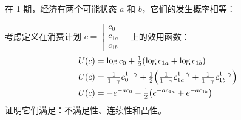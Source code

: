 \begin{problem}
 在 1 期，经济有两个可能状态 $a$ 和 $b$，它们的发生概率相等：
\begin{center}
\end{center}
考虑定义在消费计划 $c=\begin{bmatrix}c_{0} \\ c_{1a} \\ c_{1b}\end{bmatrix}$ 上的效用函数：
\[
    \begin{aligned}
        U(c) &= \log c_{0}+\tfrac12(\log c_{1a}+\log c_{1b})\\
        U(c) &= \tfrac{1}{1-\gamma}c_{0}^{1-\gamma}+\tfrac12\Bigl(\tfrac{1}{1-\gamma}c_{1a}^{1-\gamma}+\tfrac{1}{1-\gamma}c_{1b}^{1-\gamma}\Bigr)\\
        U(c) &= -e^{-ac_{0}}-\tfrac12\bigl(e^{-ac_{1a}}+e^{-ac_{1b}}\bigr)
    \end{aligned}
\]
证明它们满足：不满足性、连续性和凸性。
\end{problem}
